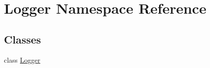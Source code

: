 \hypertarget{namespace_logger}{\section{Logger Namespace Reference}
\label{namespace_logger}
}
\subsection*{Classes}
\begin{DoxyCompactItemize}
\item 
class \hyperlink{class_logger_1_1_logger}{Logger}
\end{DoxyCompactItemize}
